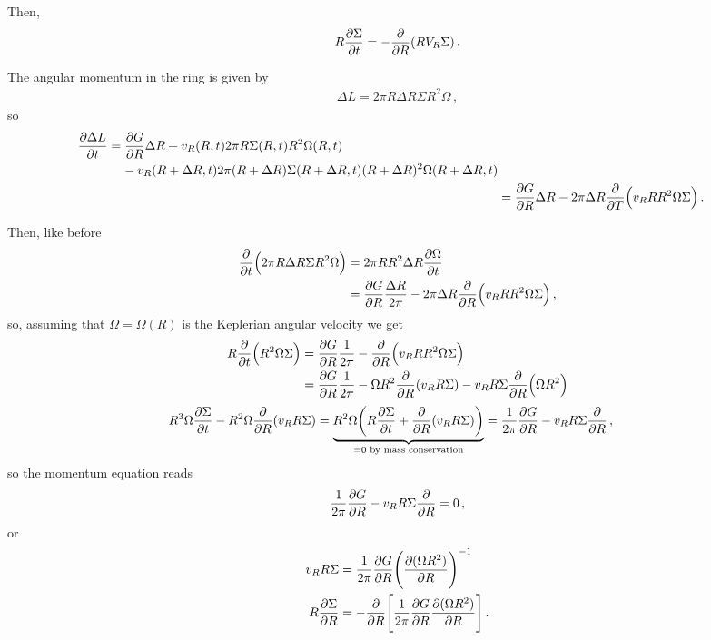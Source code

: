 \documentclass[main.tex]{subfiles}
\begin{document}
Then,  
%
\begin{align}
R \pdv{\Sigma }{t} = - \pdv{}{R} \qty(R V_R \Sigma )
\,.
\end{align}

The angular momentum in the ring is given by 
%
\begin{align}
\Delta L = 2 \pi R \Delta R \Sigma R^2 \Omega 
\,,
\end{align}
%
so 
%
\begin{align}
\begin{split}
\pdv{\Delta L}{t}
&= \pdv{G}{R} \Delta R 
+ v_R( R, t) 2 \pi R \Sigma (R, t) R^2\Omega (R, t) \\
&\phantom{=}\ - v_R(R + \Delta R, t) 2 \pi (R + \Delta R) \Sigma (R + \Delta R, t)( R + \Delta R)^2 \Omega (R + \Delta R, t)
\end{split}  \\
&= \pdv{G}{R} \Delta R - 2 \pi \Delta R \pdv{}{T} \qty(v_R R R^2 \Omega \Sigma )
\,.
\end{align}

Then, like before 
%
\begin{align}
\pdv{}{t} \qty(2 \pi R \Delta R \Sigma R^2 \Omega ) &= 2 \pi R R^2 \Delta R \pdv{\Omega }{t}   \\
&= \pdv{G}{R} \frac{\Delta R}{2 \pi }  - 2 \pi \Delta R \pdv{}{R} \qty(v_R R R^2 \Omega \Sigma )
\,,
\end{align}
%
so, assuming that \(\Omega = \Omega (R)\) is the Keplerian angular velocity we get 
%
\begin{align}
R \pdv{}{t} \qty(R^2\Omega \Sigma ) &= \pdv{G}{R} \frac{1}{2 \pi } - \pdv{}{R} \qty(v_R R R^2 \Omega \Sigma )  \\
&= \pdv{G}{R} \frac{1}{2 \pi } - \Omega R^2 \pdv{}{R} \qty(v_R R \Sigma ) - v_R R \Sigma \pdv{}{R} \qty(\Omega R^2) 
\end{align}
\begin{align}
R^3 \Omega \pdv{\Sigma }{t} - R^2 \Omega \pdv{}{R} \qty(v_R R \Sigma ) 
= \underbrace{R^2 \Omega \qty(R \pdv{\Sigma }{t} + \pdv{}{R} \qty(v_R R \Sigma ))}_{= 0 \text{ by mass conservation}}
&= \frac{1}{2 \pi } \pdv{G}{R} - v_R R \Sigma \pdv{}{R} (\Omega R^2)
\,,
\end{align}
%
so the momentum equation reads 
%
\begin{align}
\frac{1}{2 \pi } \pdv{G}{R} - v_R R \Sigma \pdv{}{R} (\Omega R^2) = 0
\,,
\end{align}
%
or 
%
\begin{align}
v_R R \Sigma &= \frac{1}{2 \pi } \pdv{G}{R} \qty(\pdv{(\Omega R^2)}{R})^{-1}  \\
R \pdv{\Sigma }{R} &= - \pdv{}{R} \qty[ \frac{1}{2 \pi } \pdv{G}{R} \pdv{(\Omega R^2)}{R}]
\,.
\end{align}
\end{document}
